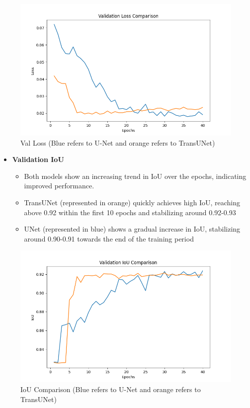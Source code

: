 \documentclass[11pt,a4paper]{article}
\begin{document}
\begin{figure}[H]
    \centering
    \includegraphics[width= 0.9\linewidth]{val_loss.png}
    \caption{Val Loss (Blue refers to U-Net and orange refers to TransUNet)}
    
\end{figure}
\pagebreak
\begin{itemize}
    \item \textbf{Validation IoU}
    \begin{itemize}
        \item Both models show an increasing trend in IoU over the epochs, indicating improved performance.
        \item TransUNet (represented in orange) quickly achieves high IoU, reaching above 0.92 within the first 10 epochs and stabilizing around 0.92-0.93
        \item UNet (represented in blue) shows a gradual increase in IoU, stabilizing around 0.90-0.91 towards the end of the training period
        
    \end{itemize}
\end{itemize}
\begin{figure}[H]
    \centering
    \includegraphics[width= 0.9\linewidth]{IOU.png}
    \caption{IoU Comparison (Blue refers to U-Net and orange refers to TransUNet)}
\end{figure}
\end{document}
